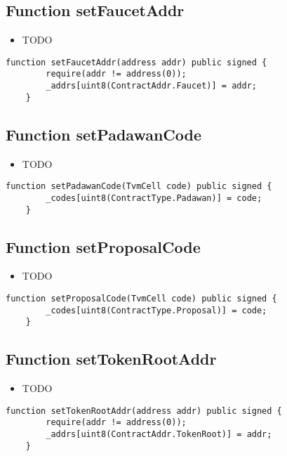 \subsection{Function setFaucetAddr}

\begin{itemize}
\item TODO
\end{itemize}

\begin{lstlisting}[firstnumber=29]
    function setFaucetAddr(address addr) public signed {
        require(addr != address(0));
        _addrs[uint8(ContractAddr.Faucet)] = addr;
    }
\end{lstlisting}

\subsection{Function setPadawanCode}

\begin{itemize}
\item TODO
\end{itemize}

\begin{lstlisting}[firstnumber=14]
    function setPadawanCode(TvmCell code) public signed {
        _codes[uint8(ContractType.Padawan)] = code;
    }
\end{lstlisting}

\subsection{Function setProposalCode}

\begin{itemize}
\item TODO
\end{itemize}

\begin{lstlisting}[firstnumber=17]
    function setProposalCode(TvmCell code) public signed {
        _codes[uint8(ContractType.Proposal)] = code;
    }
\end{lstlisting}

\subsection{Function setTokenRootAddr}

\begin{itemize}
\item TODO
\end{itemize}

\begin{lstlisting}[firstnumber=25]
    function setTokenRootAddr(address addr) public signed {
        require(addr != address(0));
        _addrs[uint8(ContractAddr.TokenRoot)] = addr;
    }
\end{lstlisting}
